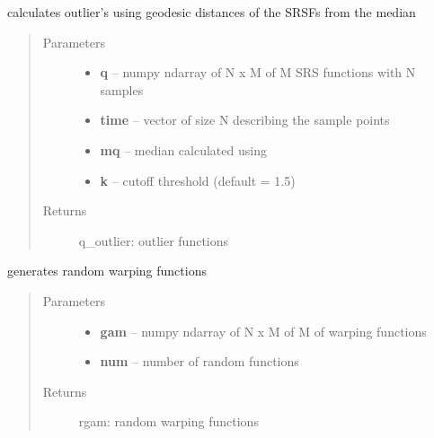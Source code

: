 \documentclass[letterpaper,10pt,english]{sphinxmanual}
\begin{document}

\begin{fulllineitems}
\label{utility_functions:utility_functions.outlier_detection}
calculates outlier's using geodesic distances of the SRSFs from the median
\begin{quote}\begin{description}
\item[{Parameters}] \leavevmode\begin{itemize}
\item {} 
\textbf{q} -- numpy ndarray of N x M of M SRS functions with N samples

\item {} 
\textbf{time} -- vector of size N describing the sample points

\item {} 
\textbf{mq} -- median calculated using {\hyperref[time_warping:time_warping.srsf_align]{}}

\item {} 
\textbf{k} -- cutoff threshold (default = 1.5)

\end{itemize}

\item[{Returns}] \leavevmode
q\_outlier: outlier functions

\end{description}\end{quote}

\end{fulllineitems}


\begin{fulllineitems}
\label{utility_functions:utility_functions.randomGamma}
generates random warping functions
\begin{quote}\begin{description}
\item[{Parameters}] \leavevmode\begin{itemize}
\item {} 
\textbf{gam} -- numpy ndarray of N x M of M of warping functions

\item {} 
\textbf{num} -- number of random functions

\end{itemize}

\item[{Returns}] \leavevmode
rgam: random warping functions

\end{description}\end{quote}

\end{fulllineitems}
\end{document}
